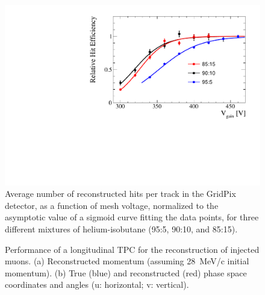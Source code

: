 \begin{refsection}
        \begin{figure}
            \centering
            \includegraphics[width=0.5 \linewidth]{Figures/muEDM/gridpix_plateau.pdf}    
            \caption{Average number of reconstructed hits per track in the GridPix detector, as a function of mesh voltage, normalized to the asymptotic value of a sigmoid curve fitting the data points, for three different mixtures of helium-isobutane (95:5, 90:10, and 85:15).}
            \label{fig:gridpix_plateau}
        \end{figure}
        
        \begin{figure}
            \centering
            \caption{Performance of a longitudinal TPC for the reconstruction of injected muons. (a) Reconstructed momentum (assuming \SI{28}{MeV/c} initial momentum). (b) True (blue) and reconstructed (red) phase space coordinates and angles (u: horizontal; v: vertical).}
        \label{fig:tpc_reso}
        \end{figure}
        

\end{refsection}
